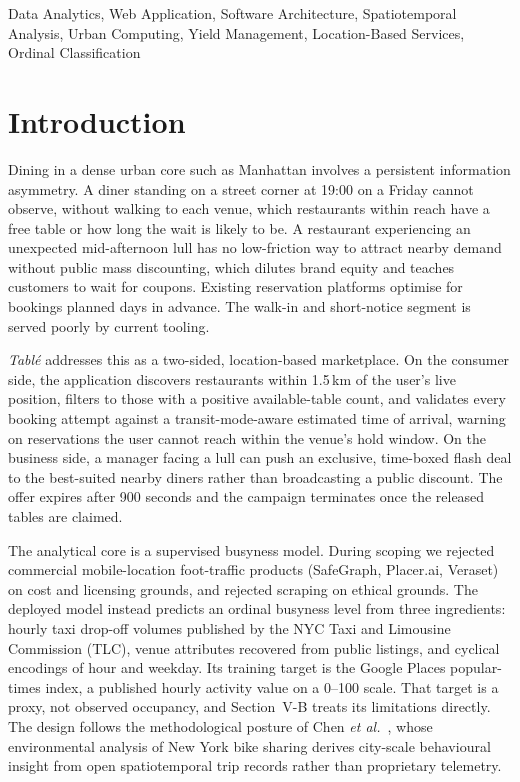 \documentclass[conference]{IEEEtran}
\begin{document}
\begin{IEEEkeywords}
Data Analytics, Web Application, Software Architecture, Spatiotemporal Analysis, Urban Computing, Yield Management, Location-Based Services, Ordinal Classification
\end{IEEEkeywords}

\section{Introduction}

Dining in a dense urban core such as Manhattan involves a persistent information asymmetry. A diner standing on a street corner at 19:00 on a Friday cannot observe, without walking to each venue, which restaurants within reach have a free table or how long the wait is likely to be. A restaurant experiencing an unexpected mid-afternoon lull has no low-friction way to attract nearby demand without public mass discounting, which dilutes brand equity and teaches customers to wait for coupons. Existing reservation platforms optimise for bookings planned days in advance. The walk-in and short-notice segment is served poorly by current tooling.

\textit{Tabl\'{e}} addresses this as a two-sided, location-based marketplace. On the consumer side, the application discovers restaurants within 1.5\,km of the user's live position, filters to those with a positive available-table count, and validates every booking attempt against a transit-mode-aware estimated time of arrival, warning on reservations the user cannot reach within the venue's hold window. On the business side, a manager facing a lull can push an exclusive, time-boxed flash deal to the best-suited nearby diners rather than broadcasting a public discount. The offer expires after 900 seconds and the campaign terminates once the released tables are claimed.

The analytical core is a supervised busyness model. During scoping we rejected commercial mobile-location foot-traffic products (SafeGraph, Placer.ai, Veraset) on cost and licensing grounds, and rejected scraping on ethical grounds. The deployed model instead predicts an ordinal busyness level from three ingredients: hourly taxi drop-off volumes published by the NYC Taxi and Limousine Commission (TLC), venue attributes recovered from public listings, and cyclical encodings of hour and weekday. Its training target is the Google Places popular-times index, a published hourly activity value on a 0--100 scale. That target is a proxy, not observed occupancy, and Section~V-B treats its limitations directly. The design follows the methodological posture of Chen \textit{et al.}~\cite{b1}, whose environmental analysis of New York bike sharing derives city-scale behavioural insight from open spatiotemporal trip records rather than proprietary telemetry.
\end{document}
